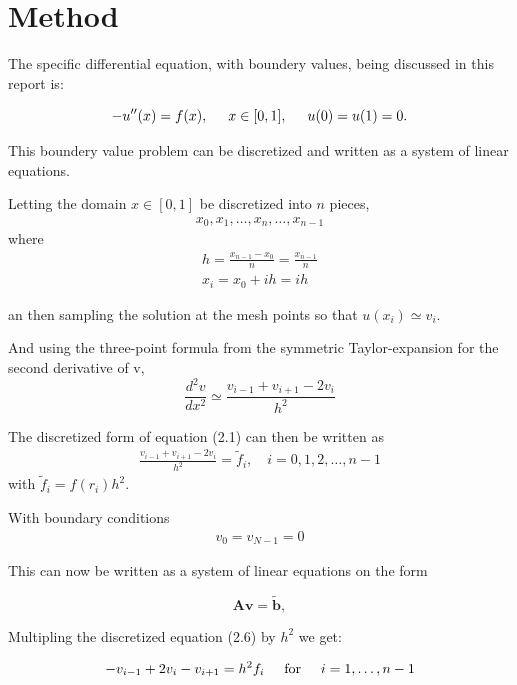\documentclass[11pt,a4paper,english,draft]{article}
\numberwithin{equation}{section}
\newcommand{\ve}[1]{\mathbf{#1}} %
\newcommand{\spac}{\hspace{5mm}}
\begin{document}
\section{Method}

The specific differential equation, with boundery values, being discussed in this report is: 

\begin{equation}
-u''(x) = f(x), \spac x \in [0,1], \spac u(0) = u(1) = 0.
\end{equation}

This boundery value problem can be discretized and written as a system of linear equations.

Letting the domain $x \in [0,1]$ be discretized into $n$ pieces,
\begin{gather}
x_0, x_1, \dots, x_{n}, \dots, x_{n-1}
\end{gather}
where 
\begin{gather}
h = \frac{x_{n-1} - x_0}{n} = \frac{x_{n-1}}{n}\\
x_i = x_0 + ih = ih
\end{gather}

an then sampling the solution at the mesh points so that $u(x_i) \simeq v_i$.

And using the three-point formula from the symmetric 
Taylor-expansion for the second derivative of v,
\begin{equation}
\frac{d^2v}{dx^2} \simeq \frac{v_{i-1} + v_{i+1} - 2v_i}{h^2}
\end{equation}

The discretized form of equation (2.1) can then be written as
\begin{gather}
\frac{v_{i-1} + v_{i+1} - 2v_i}{h^2} = \tilde{f}_i , \quad i=0,1,2, \dots, n-1 
\end{gather}
with $\tilde{f}_i = f(r_i) h^2$.

With boundary conditions 
\begin{gather}
v_0 = v_{N-1} = 0
\end{gather}

This can now be written as a system of linear equations on the form 

\begin{equation}
   \ve{A}\ve{v} = \tilde{\ve{b}},
   \label{eq:Avb}
\end{equation}

Multipling the discretized equation (2.6) by $h^2$ we get:

\begin{gather*}
   -v_{i-1}+2v_{i}-v_{i+1}=h^2 f_i \hspace{0.5cm} \mathrm{for} \hspace{0.5cm} i=1,\dots, n-1 
\end{gather*}
\end{document}
